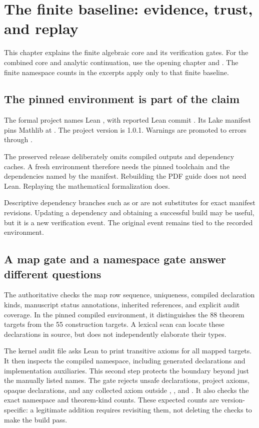 \clearpage
\section{The finite baseline: evidence, trust, and replay}
This chapter explains the finite algebraic core and its verification gates. For the combined core and analytic continuation, use the opening chapter and . The finite namespace counts in the excerpts apply only to that finite baseline.
\subsection{The pinned environment is part of the claim}
The formal project names Lean , with reported Lean commit . Its Lake manifest pins Mathlib at . The project version is 1.0.1. Warnings are promoted to errors through .

The preserved release deliberately omits compiled outputs and dependency caches. A fresh environment therefore needs the pinned toolchain and the dependencies named by the manifest. Rebuilding the PDF guide does not need Lean. Replaying the mathematical formalization does.

Descriptive dependency branches such as  or  are not substitutes for exact manifest revisions. Updating a dependency and obtaining a successful build may be useful, but it is a new verification event. The original event remains tied to the recorded environment.

\subsection{A map gate and a namespace gate answer different questions}
The authoritative  checks the map row sequence, uniqueness, compiled declaration kinds, manuscript status annotations, inherited references, and explicit audit coverage. In the pinned compiled environment, it distinguishes the 88 theorem targets from the 55 construction targets. A lexical scan can locate these declarations in source, but does not independently elaborate their types.

The kernel audit file asks Lean to print transitive axioms for all mapped targets. It then inspects the compiled  namespace, including generated declarations and implementation auxiliaries. This second step protects the boundary beyond just the manually listed names.
The gate rejects unsafe declarations, project axioms, opaque declarations, and any collected axiom outside , , and . It also checks the exact namespace and theorem-kind counts. These expected counts are version-specific: a legitimate addition requires revisiting them, not deleting the checks to make the build pass.

